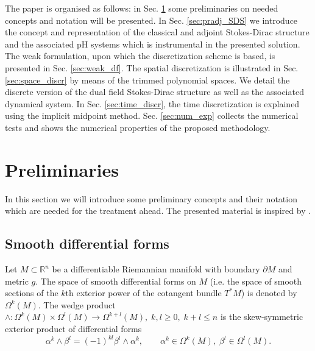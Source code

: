 \documentclass{elsarticle}
\newcommand{\revTwo}[1]{{\color{black}#1}}
\newcommand{\bbR}{\mathbb{R}}
\begin{document}
The paper is organised as follows: in Sec. \ref{sec:prel} some preliminaries on needed concepts and notation will be presented. In Sec. \ref{sec:pradj_SDS} we introduce the concept and representation of the \revTwo{classical} and adjoint Stokes-Dirac structure and the associated pH systems which is instrumental in the presented solution. The weak formulation, upon which the discretization scheme is based, is presented in Sec. \ref{sec:weak_df}. The spatial discretization is illustrated in Sec. \ref{sec:space_discr} by means of the trimmed polynomial spaces. We detail the discrete version of the dual field Stokes-Dirac structure as well as the associated dynamical system. In Sec. \ref{sec:time_discr}, the time discretization is explained using the implicit midpoint method. Sec. \ref{sec:num_exp} collects the numerical tests and shows the numerical \revTwo{properties} of the proposed methodology. 

\section{Preliminaries}\label{sec:prel}
In this section we will introduce some preliminary concepts and their notation which are needed for the treatment ahead. The presented material is inspired by \cite{bochev2006,arnold2018finite}.


\subsection{Smooth differential forms}

Let $M\subset \bbR^n$ be a differentiable Riemannian manifold with boundary $\partial M$ and metric $g$. The space of smooth differential forms on $M$ (i.e. the space of smooth sections of the $k$th exterior power of the cotangent bundle $T^* M$) is denoted by $\Omega^k(M)$. The wedge product \revTwo{$\wedge : \Omega^k(M) \times \Omega^l(M) \rightarrow \Omega^{k+l}(M), \; k,l \ge 0, \; k+l \le n$} is the skew-symmetric exterior product of differential forms
\begin{equation}\label{eq:skew_wedge}
    \alpha^k \wedge \beta^l = (-1)^{kl} \beta^l \wedge \alpha^k,
    \qquad \alpha^k \in \Omega^k(M), \; \beta^l \in \Omega^l(M).
\end{equation}
\end{document}
